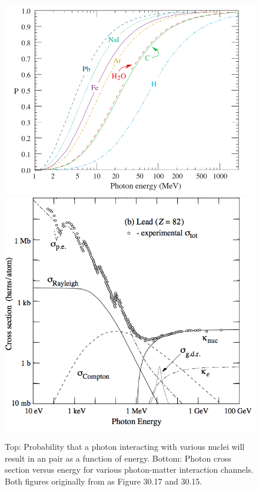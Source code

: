\begin{figure}[!]
	\centering
	\vspace{-0.5cm}
		\includegraphics[width=0.85\columnwidth]{Figures/Beringer12_30_17.png}
		\includegraphics[width=0.85\columnwidth]{Figures/Beringer12_30_15.png}
	\caption[Top:Probability of photon conversion to e$^-$ e$^+$ pair. Bottom: Photon cross section versus energy]{Top: Probability that a photon interacting with various nuclei will result in an \ee{} pair as a function of energy. Bottom: Photon cross section versus energy for various photon-matter interaction channels. Both figures originally from \cite{Beringer12} as Figure 30.17 and 30.15.}
	\label{fig:pairProd}
\end{figure}

